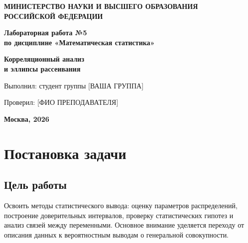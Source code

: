 \documentclass[12pt, a4paper]{article}
\begin{document}
\begin{titlepage}
\begin{center}
\textbf{\Large МИНИСТЕРСТВО НАУКИ И ВЫСШЕГО ОБРАЗОВАНИЯ \\ РОССИЙСКОЙ ФЕДЕРАЦИИ}

\vspace{2cm}

\textbf{\large Лабораторная работа №5} \\
\textbf{\large по дисциплине «Математическая статистика»}

\vspace{1cm}

\textbf{\Large Корреляционный анализ \\ и эллипсы рассеивания}

\vspace{2cm}

\begin{flushleft}
Выполнил: студент группы [ВАША ГРУППА] \\
[ВАША ФАМИЛИЯ И.О.]

\vspace{0.5cm}

Проверил: [ФИО ПРЕПОДАВАТЕЛЯ]
\end{flushleft}

\vfill

\textbf{Москва, 2026}
\end{center}
\end{titlepage}

\tableofcontents
\newpage

\section{Постановка задачи}

\subsection{Цель работы}
Освоить методы статистического вывода: оценку параметров распределений, построение доверительных интервалов, проверку статистических гипотез и анализ связей между переменными. Основное внимание уделяется переходу от описания данных к вероятностным выводам о генеральной совокупности.
\end{document}
